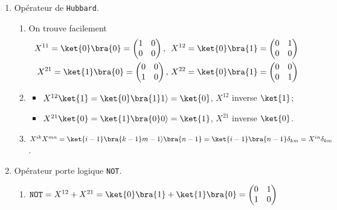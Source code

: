 \begin{solution}

\begin{enumerate}
\item Opérateur de \texttt{Hubbard}.
\begin{enumerate}
\item On trouve facilement
\begin{equation}
\begin{split}
X^{11}=\ket{0}\bra{0} =
\begin{pmatrix}
1 & 0\\
0 & 0
\end{pmatrix}
,\,\ X^{12}=\ket{0}\bra{1} =
\begin{pmatrix}
0 & 1\\
0 & 0
\end{pmatrix}
\\
X^{21}=\ket{1}\bra{0} =
\begin{pmatrix}
0 & 0\\
1 & 0
\end{pmatrix}
,\,X^{22}=\ket{0}\bra{1} =
\begin{pmatrix}
0 & 0\\
0 & 1
\end{pmatrix}
\end{split}
\end{equation}
\item
\begin{itemize}
\item $X^{12}\ket{1}=\ket{0}\bra{1}1\rangle=\ket{0}$, $X^{12}$ inverse
$\ket{1}$;
\item $X^{21}\ket{0}=\ket{1}\bra{0}0\rangle=\ket{1}$, $X^{21}$ inverse
$\ket{0}$.
\end{itemize}

\item $X^{ik}X^{mn}=\ket{i-1}\bra{k-1}m-1\rangle\bra{n-1}
=\ket{i-1}\bra{n-1}\delta_{km}=X^{in}\delta_{km}$.
\end{enumerate}

\item Opérateur porte logique \texttt{NOT}.

\begin{enumerate}
 \item $\mathtt{NOT}=X^{12}+X^{21}=\ket{0}\bra{1}+\ket{1}\bra{0} =
\begin{pmatrix}
0 & 1\\
1 & 0
\end{pmatrix}$


\end{enumerate}
\end{enumerate}
\end{solution}
